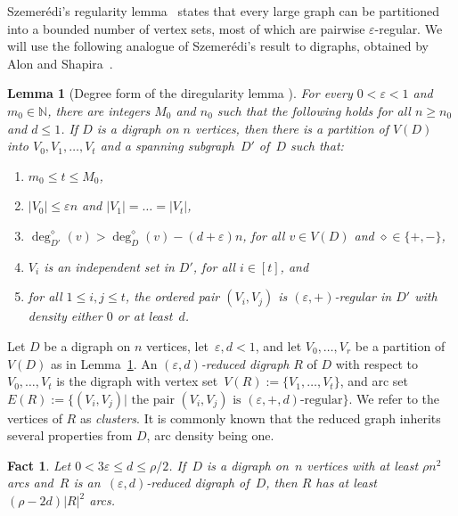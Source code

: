 \documentclass[11pt]{article}
\newtheorem{lemma}[theorem]{Lemma}
\newtheorem{fact}[theorem]{Fact}
\numberwithin{equation}{section}
\renewcommand{\geq}{\geqslant}
\renewcommand{\leq}{\leqslant}
\newcommand{\defi}[1]{\emph{\color{red!50!black}#1}}
\def\NN{\mathbb N}
\let\eps=\varepsilon
\theoremstyle{definition}
\def\eps{{\varepsilon}}
\begin{document}
Szemerédi’s regularity lemma~\cite{szemeredi} states that every large graph can be partitioned into a bounded
number of vertex sets, most of which are pairwise $\eps$-regular. We will use the following analogue of Szemerédi’s result to digraphs, obtained by Alon and Shapira~\cite{alon2003testing}.

\begin{lemma}[Degree form of the diregularity lemma \cite{alon2003testing}]
  \label{lemma:diregularity}
  For every $0<\eps < 1$ and $m_0 \in \NN$, there are integers $M_0$ and $n_0$
  such that the following holds for all $n \geq n_0$ and $d \leq 1$.
  If $D$ is a digraph on $n$ vertices, then there is a partition of $V(D)$
  into $V_0,V_1,\dots,V_t$ and a spanning subgraph~$D'$ of~$D$ such that:
  \begin{enumerate}[label = \upshape{(\alph*)}]
    \item $m_0 \leq t \leq M_0$,
    \item $|V_0| \leq \eps n$ and $|V_1|=\dots=|V_t|$,
    \item $\deg_{D'}^{\diamond}(v) > \deg_{D}^{\diamond}(v) - (d+\eps)n$,
      for all $v \in V(D)$ and $\diamond \in \{+,-\}$,
    \item $V_i$ is an independent set in $D'$, for all $i \in [t]$, and
    \item for all $1 \leq i,j \leq t$, the ordered pair $(V_i,V_j)$ is
      $(\eps,+)$-regular in $D'$ with density either $0$ or at least~$d$.
  \end{enumerate}
\end{lemma}

Let $D$ be a digraph on $n$ vertices, let~${\eps, d < 1}$, and let $V_0,\dots,V_r$ be a partition
of $V(D)$ as in Lemma~\ref{lemma:diregularity}. An \defi{$(\eps,d)$-reduced digraph} $R$
of $D$ with respect to $V_0,\dots,V_t$ is the digraph with vertex set~${V(R) := \{V_1,\dots,V_t\}}$, and arc set $E(R):=\{(V_i, V_j)|\text{ the pair~$(V_i,V_j)$ is~$(\eps,+,d)$-regular}\}$. We refer to the vertices of $R$ as \defi{clusters}. It is commonly known that the reduced graph inherits several properties from $D$, arc density being one. 

\begin{fact}
    \label{fact:reg_edges}
    Let $0<3\eps\leq d\leq \rho/2$. If~$D$ is a digraph on~$n$ vertices with at least $\rho n^2$ arcs and~$R$ is
  an~$(\eps, d)$-reduced digraph of~$D$,
  then $R$ has at least $(\rho - 2d)|R|^2$ arcs. 
\end{fact}
\end{document}
